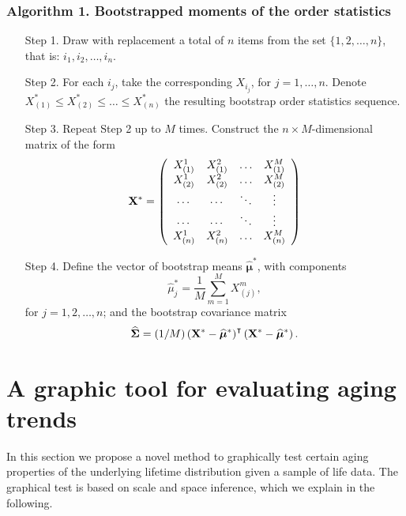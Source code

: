 \documentclass[preprint,12pt]{elsarticle}
\begin{document}
\subsubsection*{Algorithm 1. Bootstrapped moments of the order statistics}
\begin{enumerate}
\item[Step 1.] Draw with replacement a total of $n$ items from the set $\{1,2, \ldots, n\}$, that is: $i_1,i_2, \ldots, i_n$.
\item[Step 2.] For each $i_j$, take the corresponding $X_{i_j}$, for $j=1,\ldots, n$. Denote $X^*_{(1)} \leq X^*_{(2)}\leq  \ldots \leq X^*_{(n)}$ the resulting bootstrap order statistics sequence.  
\item[Step 3.] Repeat Step 2 up to $M$ times. Construct the $n \times M$-dimensional matrix of the form
$${\bf X}^*=\left(\begin{array} {cccc}
                     X^1_{(1)} & X^2_{(1)}&  \ldots & X^M_{(1)} \\
                     X^1_{(2)} & X^2_{(2)}&  \ldots & X^M_{(2)} \\
										 \cdots    & \cdots   &  \ddots  & \vdots    \\
										 \cdots    & \cdots   &  \ddots  & \vdots    \\
										 X^1_{(n)} & X^2_{(n)}&  \ldots & X^M_{(n)} \\
              \end{array}\right)$$
\item[Step 4.] Define the vector of bootstrap means $\widehat{\boldsymbol \mu}^*$, with components 
$$\widehat{ \mu}_j^*=\frac{1}{M}\sum_{m=1}^M X_{(j)}^m,$$
 for $j=1,2, \ldots, n$; and the bootstrap covariance matrix  
$$\widehat{\boldsymbol \Sigma}=(1/M)\left({\bf X}^*-\widehat{\boldsymbol \mu}^*\right)^{\intercal}\left({\bf X}^*-\widehat{\boldsymbol \mu}^*\right).$$
\end{enumerate}

\bigskip

\section{A graphic tool for evaluating aging trends}  \label{sizer1}
In this section we propose a novel method to graphically test certain aging properties of the underlying lifetime distribution given a sample of life data. The graphical test is based on scale and space inference, which we explain in the following.
\end{document}

